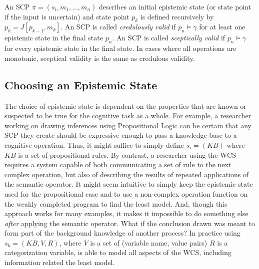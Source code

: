\documentclass{article}
\begin{document}
An SCP $\pi=(s_i,m_1,...,m_n)$ describes an initial epistemic state (or state point if the input is uncertain) and state point $p_k$ is defined recursively by $p_k = J[p_{k-1},m_k]$. An SCP is called \textit{credulously valid} if $p_n \models \gamma$ for at least one epistemic state in the final state $p_n$. An SCP is called \textit{sceptically valid} if $p_n \models \gamma$ for every epistemic state in the final state. In cases where all operations are monotonic, sceptical validity is the same as credulous validity.


\subsection{Choosing an Epistemic State}
The choice of epistemic state is dependent on the properties that are known or suspected to be true for the cognitive task as a whole. For example, a researcher working on drawing inferences using Propositional Logic can be certain that any SCP they create should be expressive enough to pass a knowledge base to a cognitive operation. Thus, it might suffice to simply define $s_i=(KB)$ where $KB$ is a set of propositional rules. By contrast, a researcher using the WCS requires a system capable of both communicating a set of rule to the next complex operation, but also of describing the results of repeated applications of the semantic operator. It might seem intuitive to simply keep the epistemic state used for the propositional case and to use a non-complex operation function on the weakly completed program to find the least model. And, though this approach works for many examples, it makes it impossible to do something else \textit{after} applying the semantic operator. What if the conclusion drawn was meant to form part of the background knowledge of another process? In practice using $s_k=(KB,V, R)$, where $V$ is a set of (variable name, value pairs) $R$ is a categorization variable, is able to model all aspects of the WCS, including information related the least model. 
\end{document}
